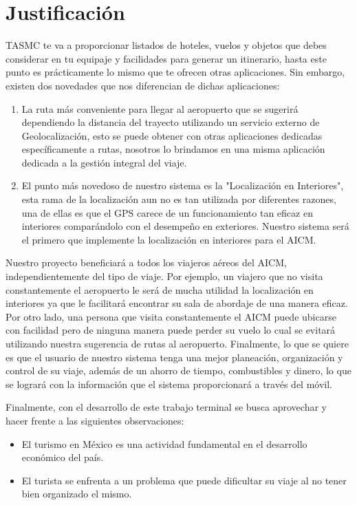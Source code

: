 \section{Justificación}

TASMC te va a proporcionar listados de hoteles, vuelos y objetos que debes considerar en tu equipaje y facilidades para generar un itinerario, hasta este punto es prácticamente lo mismo que te ofrecen otras aplicaciones. Sin embargo, existen dos novedades que nos diferencian de dichas aplicaciones:

\begin{enumerate}
	\item La ruta más conveniente para llegar al aeropuerto que se sugerirá dependiendo la distancia del  trayecto utilizando un servicio externo de Geolocalización, esto se puede obtener con otras aplicaciones dedicadas específicamente a rutas, nosotros lo brindamos en una misma aplicación dedicada a la gestión integral del viaje.
	\item El punto más novedoso de nuestro sistema es la "Localización en Interiores", esta rama de la localización aun no es tan utilizada por diferentes razones, una de ellas es que el GPS carece de un funcionamiento tan eficaz en interiores comparándolo con el desempeño en exteriores. Nuestro sistema será el primero que implemente la localización en interiores para el AICM.  
\end{enumerate}

Nuestro proyecto beneficiará a todos los viajeros aéreos del AICM, independientemente del tipo de viaje. Por ejemplo, un viajero que no visita constantemente el aeropuerto le será de mucha utilidad la localización en interiores ya que le facilitará encontrar su sala de abordaje de una manera eficaz. Por otro lado, una persona que visita constantemente el AICM puede ubicarse con facilidad pero de ninguna manera puede perder su vuelo lo cual se evitará utilizando nuestra sugerencia de rutas al aeropuerto. Finalmente, lo que se quiere es que el usuario de nuestro sistema tenga una mejor planeación, organización y control de su viaje, además de un ahorro de tiempo, combustibles y dinero, lo que se logrará con la información que el sistema proporcionará a través del móvil.
 
Finalmente, con el desarrollo de este trabajo terminal se busca aprovechar y hacer frente a las siguientes observaciones:

\begin{itemize}
	\item El turismo en México es una actividad fundamental en el desarrollo económico del país.
	\item El turista se enfrenta a un problema que puede dificultar su viaje al no tener bien organizado el mismo.
\end{itemize}

